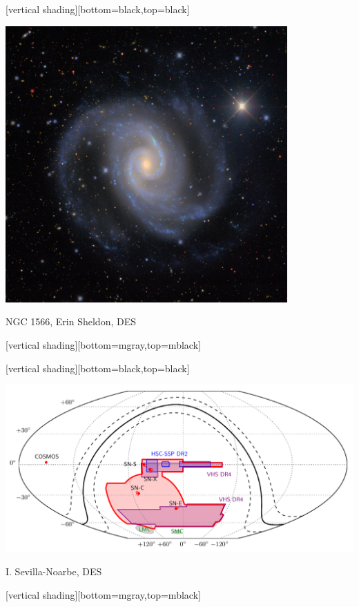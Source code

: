 \documentclass{beamer}
\begin{document}
{
    [vertical shading][bottom=black,top=black]
	
    \frame
    {

        \begin{center}
            \includegraphics[width=0.81\textwidth]{DES0421-5457-gri-ngc1566.jpg}

            {\tiny \hfill NGC 1566, Erin Sheldon, DES}
        \end{center}
    }

    [vertical shading][bottom=mgray,top=mblack]

}

{
    [vertical shading][bottom=black,top=black]
	
    \frame
    {

        \begin{center}
            \includegraphics[width=1.0\textwidth]{des_footprint_v6.pdf}

            {\tiny \hfill I. Sevilla-Noarbe, DES}
        \end{center}
    }

    [vertical shading][bottom=mgray,top=mblack]

}
\end{document}
